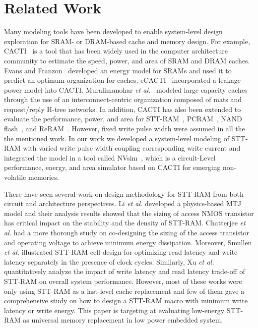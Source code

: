 \section{Related Work} \label{sec:relate}

Many modeling tools have been developed to enable system-level design exploration for SRAM- or DRAM-based cache and memory design.  For example, CACTI~\cite{CACTI51} is a tool that has been widely used in the computer architecture community to estimate the speed, power, and area of SRAM and DRAM caches.  Evans and Franzon~\cite{CACTI:JSSC95:Evans} developed an energy model for SRAMs and used it to predict an optimum organization for caches.  eCACTI~\cite{eCACTI} incorporated a leakage power model into CACTI.  Muralimanohar \emph{et al.}~\cite{CACTI60} modeled large capacity caches through the use of an interconnect-centric organization composed of mats and request/reply H-tree networks. In addition, CACTI has also been extended to evaluate the performance, power, and area for STT-RAM~\cite{CACTI:DAC08:Dong}, PCRAM~\cite{CACTI:PCRAMsim}, NAND flash~\cite{CACTI:DATE10:Mohan}, and ReRAM~\cite{CACTI:DATE11:Xu}. However, fixed write pulse width were assumed in all the the mentioned work. In our work we developed a system-level modeling of STT-RAM with varied write pulse width coupling corresponding write current and integrated the model in a tool called NVsim~\cite{CACTI:PCRAMsim}, which is a circuit-Level performance, energy, and area simulator based on CACTI for emerging non-volatile memories.

There have seen several work on design methodology for STT-RAM from both circuit and architecture perspectives. Li \emph{et al.} developed a physics-based MTJ model and their analysis results showed that the sizing of access NMOS transistor has critical impact on the stability and the density of STT-RAM. Chatterjee \emph{et al.} had a more thorough study on co-designing the sizing of the access transistor and operating voltage to achieve minimum energy dissipation. Moreover, Smullen \emph{et al.} illustrated STT-RAM cell design for optimizing read latency and write latency separately in the presence of clock cycles. Similarly, Xu \emph{et al.} quantitatively analyze the impact of write latency and read latency trade-off of STT-RAM on overall system performance. However, most of these works were only using STT-RAM as a last-level cache replacement and few of them gave a comprehensive study on how to design a STT-RAM macro with minimum write latency or write energy. This paper is targeting at evaluating low-energy STT-RAM as universal memory replacement in low power embedded system.


